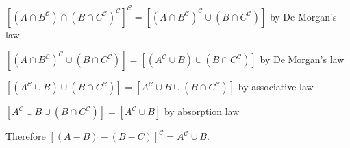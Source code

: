 \documentclass[12pt,letterpaper,titlepage]{article}
\begin{document}
\begin{raggedright}
\begin{enumerate}[resume]
$[(A\cap B^\mathcal{C})\cap(B\cap C^\mathcal{C})^\mathcal{C}]^\mathcal{C} = [(A\cap B^\mathcal{C})^\mathcal{C}\cup(B\cap C^\mathcal{C})]$ by De Morgan's law

$[(A\cap B^\mathcal{C})^\mathcal{C}\cup(B\cap C^\mathcal{C})] = [(A^\mathcal{C}\cup B)\cup(B\cap C^\mathcal{C})]$ by De Morgan's law

$[(A^\mathcal{C}\cup B)\cup(B\cap C^\mathcal{C})] = [A^\mathcal{C}\cup B\cup(B\cap C^\mathcal{C})]$ by associative law

$[A^\mathcal{C}\cup B\cup(B\cap C^\mathcal{C})] = [A^\mathcal{C}\cup B]$ by absorption law

Therefore $[(A-B)-(B-C)]^\mathcal{C}=A^\mathcal{C}\cup B$.

\end{enumerate}

\end{raggedright}
\end{document}
